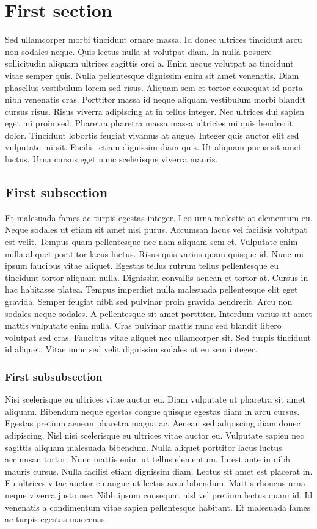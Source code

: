 \documentclass[epsf,a4paper]{book}
\begin{document}
\section{First section}
Sed ullamcorper morbi tincidunt ornare massa. Id donec ultrices tincidunt arcu non sodales neque. Quis lectus nulla at volutpat diam. In nulla posuere sollicitudin aliquam ultrices sagittis orci a. Enim neque volutpat ac tincidunt vitae semper quis. Nulla pellentesque dignissim enim sit amet venenatis. Diam phasellus vestibulum lorem sed risus. Aliquam sem et tortor consequat id porta nibh venenatis cras. Porttitor massa id neque aliquam vestibulum morbi blandit cursus risus. Risus viverra adipiscing at in tellus integer. Nec ultrices dui sapien eget mi proin sed. Pharetra pharetra massa massa ultricies mi quis hendrerit dolor. Tincidunt lobortis feugiat vivamus at augue. Integer quis auctor elit sed vulputate mi sit. Facilisi etiam dignissim diam quis. Ut aliquam purus sit amet luctus. Urna cursus eget nunc scelerisque viverra mauris.

\subsection{First subsection}

Et malesuada fames ac turpis egestas integer. Leo urna molestie at elementum eu. Neque sodales ut etiam sit amet nisl purus. Accumsan lacus vel facilisis volutpat est velit. Tempus quam pellentesque nec nam aliquam sem et. Vulputate enim nulla aliquet porttitor lacus luctus. Risus quis varius quam quisque id. Nunc mi ipsum faucibus vitae aliquet. Egestas tellus rutrum tellus pellentesque eu tincidunt tortor aliquam nulla. Dignissim convallis aenean et tortor at. Cursus in hac habitasse platea. Tempus imperdiet nulla malesuada pellentesque elit eget gravida. Semper feugiat nibh sed pulvinar proin gravida hendrerit. Arcu non sodales neque sodales. A pellentesque sit amet porttitor. Interdum varius sit amet mattis vulputate enim nulla. Cras pulvinar mattis nunc sed blandit libero volutpat sed cras. Faucibus vitae aliquet nec ullamcorper sit. Sed turpis tincidunt id aliquet. Vitae nunc sed velit dignissim sodales ut eu sem integer.

\subsubsection{First subsubsection}

Nisi scelerisque eu ultrices vitae auctor eu. Diam vulputate ut pharetra sit amet aliquam. Bibendum neque egestas congue quisque egestas diam in arcu cursus. Egestas pretium aenean pharetra magna ac. Aenean sed adipiscing diam donec adipiscing. Nisl nisi scelerisque eu ultrices vitae auctor eu. Vulputate sapien nec sagittis aliquam malesuada bibendum. Nulla aliquet porttitor lacus luctus accumsan tortor. Nunc mattis enim ut tellus elementum. In est ante in nibh mauris cursus. Nulla facilisi etiam dignissim diam. Lectus sit amet est placerat in. Eu ultrices vitae auctor eu augue ut lectus arcu bibendum. Mattis rhoncus urna neque viverra justo nec. Nibh ipsum consequat nisl vel pretium lectus quam id. Id venenatis a condimentum vitae sapien pellentesque habitant. Et malesuada fames ac turpis egestas maecenas.
\end{document}
